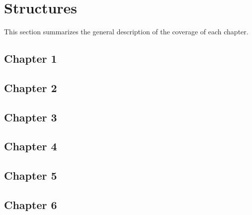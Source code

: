 \section{Structures}
This section summarizes the general description of the coverage of each chapter.

\subsection*{Chapter 1}
\subsection*{Chapter 2}
\subsection*{Chapter 3}
\subsection*{Chapter 4}
\subsection*{Chapter 5}
\subsection*{Chapter 6}
